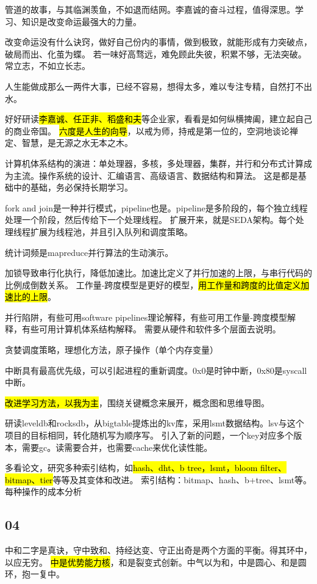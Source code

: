 管道的故事，与其临渊羡鱼，不如退而结网。李嘉诚的奋斗过程，值得深思。学习、知识是改变命运最强大的力量。

改变命运没有什么诀窍，做好自己份内的事情，做到极致，就能形成有力突破点，破局而出、化茧为蝶。
若一味好高骛远，难免顾此失彼，积累不够，无法突破。常立志，不如立长志。

人生能做成那么一两件大事，已经不容易，想得太多，难以专注专精，自然打不出水。

好好研读\hl{李嘉诚、任正非、稻盛和夫}等企业家，看看是如何纵横捭阖，建立起自己的商业帝国。
\hl{六度是人生的向导}，以戒为师，持戒是第一位的，空洞地谈论禅定、智慧，是无源之水无本之木。

计算机体系结构的演进：单处理器，多核，多处理器，集群，并行和分布式计算成为主流。操作系统的设计、汇编语言、高级语言、数据结构和算法。
这是都是基础中的基础，务必保持长期学习。

fork and join是一种并行模式，pipeline也是。pipeline是多阶段的，每个独立线程处理一个阶段，然后传给下一个处理线程。
扩展开来，就是SEDA架构。每个处理线程扩展为线程池，并且引入队列和调度策略。

统计词频是mapreduce并行算法的生动演示。

加锁导致串行化执行，降低加速比。加速比定义了并行加速的上限，与串行代码的比例成倒数关系。
工作量-跨度模型是更好的模型，\hl{用工作量和跨度的比值定义加速比的上限}。

并行陷阱，有些可用software pipelines理论解释，有些可用工作量-跨度模型解释，有些可用计算机体系结构解释。
需要从硬件和软件多个层面去说明。

贪婪调度策略，理想化方法，原子操作（单个内存变量）

中断具有最高优先级，可以引起进程的重新调度。0x0是时钟中断，0x80是syscall中断。

\hl{改进学习方法，以我为主}，围绕关键概念来展开，概念图和思维导图。

研读leveldb和rocksdb，从bigtable提炼出的kv库，采用lsmt数据结构。lsv与这个项目的目标相同，转化随机写为顺序写。
引入了新的问题，一个key对应多个版本，需要gc。读需要合并，也需要cache来优化读性能。

多看论文，研究多种索引结构，如\hl{hash、dht、b tree，lsmt，bloom filter、bitmap、tier}等等及其变体和改进。
索引结构：bitmap、hash、b+tree、lsmt等。每种操作的成本分析

\subsection{04}

中和二字是真诀，守中致和、持经达变、守正出奇是两个方面的平衡。得其环中，以应无穷。
\hl{中是优势能力核}，和是裂变式创新。中气以为和，中是圆心、和是圆环，抱一复中。

